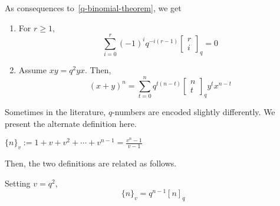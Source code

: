 \documentclass[11pt,leqno,oneside]{amsbook}
\numberwithin{thm}{section}
\newcommand{\qbinom}[3][q]{\left[\begin{array}{c}#2\\#3\end{array}\right]_{#1}}
\begin{document}
\begin{cor}
  As consequences to~\ref{q-binomial-theorem}, we get
  \begin{enumerate}
  \item For \(r \geq 1\),
    \[
      \sum_{i=0}^r (-1)^i q^{-i(r-1)} \qbinom{r}{i} = 0
    \]
  \item Assume \(xy = q^2yx\). Then, \[
      (x+y)^n = \sum_{t=0}^n q^{t(n-t)}\qbinom{n}{t}y^t x^{n-t}
    \]
  \end{enumerate}
\end{cor}
Sometimes in the literature, \(q\)-numbers are encoded slightly
differently. We present the alternate definition here.
\begin{defn}
  \(\{n\}_v := 1+v+v^2 + \cdots + v^{n-1} = \frac{v^n-1}{v-1}\)
\end{defn}
Then, the two definitions are related as follows.
\begin{prop}
  Setting \(v=q^2\), \[
    \{n\}_v = q^{n-1}[n]_q
  \]
\end{prop}
\end{document}
